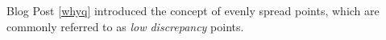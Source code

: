 Blog Post \ref{whyq} introduced the concept of evenly spread points, which are commonly referred to as \emph{low discrepancy} points. \cite{Hic97a}